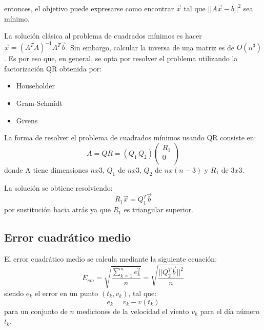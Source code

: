 \documentclass[journal, monochrome]{IEEEtran}
\begin{document}
entonces, el objetivo puede expresarse como encontrar $\vec{x}$ tal que $||A\vec{x} - {b}||^{2}$ sea mínimo.
\par
La solución clásica al problema de cuadrados mínimos es hacer $\vec{x} = (A^{T}A)^{-1}A^{T}\vec{b}$. Sin embargo, calcular la inversa de una matriz es de $O(n^{3})$. Es por eso que, en general, se opta por resolver el problema utilizando la factorización QR obtenida por:
\begin{itemize}
\item Householder
\item Gram-Schmidt
\item Givens
\end{itemize}
\par
La forma de resolver el problema de cuadrados mínimos usando QR consiste en:
\begin{equation}
A = QR = (Q_{1} \, Q_{2}) \left( \begin{array}{c}
R_{1} \\
0 \\
\end{array} \right)
\end{equation}
donde A tiene dimensiones $nx3$, $Q_{1}$ de $nx3$, $Q_{2}$ de $nx(n-3)$ y $R_{1}$ de $3x3$.
\par
La solución se obtiene resolviendo:
\begin{equation}
R_{1}\vec{x} = Q_{1}^{T}\vec{b}
\label{equation:ls}
\end{equation}
por sustitución hacia atrás ya que $R_{1}$ es triangular superior.

\vspace{0.5cm}
\subsection{Error cuadrático medio}
\par
El error cuadrático medio se calcula mediante la siguiente ecuación:
\begin{equation}
 E_{cm} = \sqrt{\frac{\sum_{k=1}^n e_k^2}{n}} = \sqrt{\frac{||Q_{2}^{T}\vec{b}||^{2}}{n}}
\end{equation}
siendo $e_k$ el error en un punto $(t_k, v_k)$, tal que:
\begin{equation}
 e_k = v_k - v(t_k)
\end{equation}
para un conjunto de $n$ mediciones de la velocidad el viento $v_k$ para el día número $t_k$.\\

\vspace{1cm}
\end{document}
